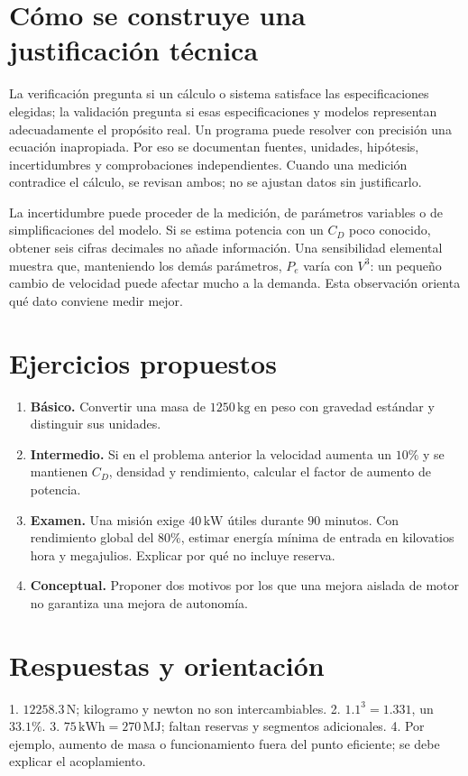 \section{Cómo se construye una justificación técnica}
La verificación pregunta si un cálculo o sistema satisface las especificaciones elegidas; la validación pregunta si esas especificaciones y modelos representan adecuadamente el propósito real. Un programa puede resolver con precisión una ecuación inapropiada. Por eso se documentan fuentes, unidades, hipótesis, incertidumbres y comprobaciones independientes. Cuando una medición contradice el cálculo, se revisan ambos; no se ajustan datos sin justificarlo.

La incertidumbre puede proceder de la medición, de parámetros variables o de simplificaciones del modelo. Si se estima potencia con un $C_D$ poco conocido, obtener seis cifras decimales no añade información. Una sensibilidad elemental muestra que, manteniendo los demás parámetros, $P_e$ varía con $V^3$: un pequeño cambio de velocidad puede afectar mucho a la demanda. Esta observación orienta qué dato conviene medir mejor.

\section{Ejercicios propuestos}
\begin{enumerate}
\item \textbf{Básico.} Convertir una masa de $1250\,\mathrm{kg}$ en peso con gravedad estándar y distinguir sus unidades.
\item \textbf{Intermedio.} Si en el problema anterior la velocidad aumenta un $10\%$ y se mantienen $C_D$, densidad y rendimiento, calcular el factor de aumento de potencia.
\item \textbf{Examen.} Una misión exige $40\,\mathrm{kW}$ útiles durante $90$ minutos. Con rendimiento global del $80\%$, estimar energía mínima de entrada en kilovatios hora y megajulios. Explicar por qué no incluye reserva.
\item \textbf{Conceptual.} Proponer dos motivos por los que una mejora aislada de motor no garantiza una mejora de autonomía.
\end{enumerate}
\section{Respuestas y orientación}
1. $12258.3\,\mathrm{N}$; kilogramo y newton no son intercambiables. 2. $1.1^3=1.331$, un $33.1\%$. 3. $75\,\mathrm{kWh}=270\,\mathrm{MJ}$; faltan reservas y segmentos adicionales. 4. Por ejemplo, aumento de masa o funcionamiento fuera del punto eficiente; se debe explicar el acoplamiento.

